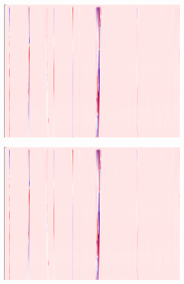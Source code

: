 \begin{figure}[!h]
    \vspace{1em}
    
    
    \begin{subfigure}{0.33\textwidth}
        \includegraphics[width=\textwidth]{figures/test.png}
    \end{subfigure}%
    \hfill
    \begin{subfigure}{0.33\textwidth}
        \includegraphics[width=\textwidth]{figures/test.png}
    \end{subfigure}%
    \hfill
    \begin{subfigure}{0.33\textwidth}

\end{subfigure}
\end{figure}
